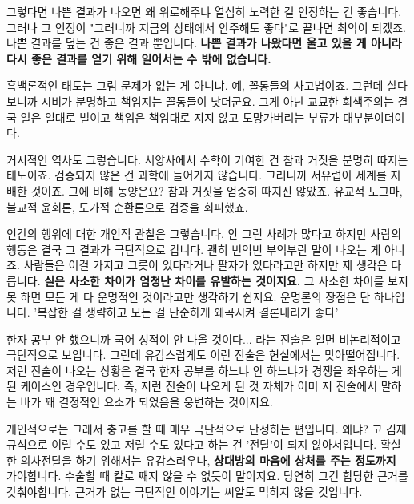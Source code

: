 그렇다면 나쁜 결과가 나오면 왜 위로해주냐
열심히 노력한 걸 인정하는 건 좋습니다. 그러나 그 인정이 "그러니까 지금의 상태에서 안주해도 좋다"로 끝나면 최악이 되겠죠.
나쁜 결과를 덮는 건 좋은 결과 뿐입니다.
\textbf{나쁜 결과가 나왔다면 울고 있을 게 아니라 다시 좋은 결과를 얻기 위해 일어서는 수 밖에 없습니다.}
\vspace{5mm}

흑백론적인 태도는 그럼 문제가 없는 게 아니냐.
예, 꼴통들의 사고법이죠.
그런데 살다보니까 시비가 분명하고 책임지는 꼴통들이 낫더군요.
그게 아닌 교묘한 회색주의는 결국 일은 일대로 벌이고 책임은 책임대로 지지 않고 도망가버리는 부류가 대부분이더이다.
\vspace{5mm}

거시적인 역사도 그렇습니다.
서양사에서 수학이 기여한 건 참과 거짓을 분명히 따지는 태도이죠.
검증되지 않은 건 과학에 들어가지 않습니다. 그러니까 서유럽이 세계를 지배한 것이죠.
그에 비해 동양은요? 참과 거짓을 엄중히 따지진 않았죠. 유교적 도그마, 불교적 윤회론, 도가적 순환론으로 검증을 회피했죠.
\vspace{5mm}

인간의 행위에 대한 개인적 관찰은 그렇습니다.
안 그런 사례가 많다고 하지만 사람의 행동은 결국 그 결과가 극단적으로 갑니다.
괜히 빈익빈 부익부란 말이 나오는 게 아니죠.
사람들은 이걸 가지고 그릇이 있다라거나 팔자가 있다라고만 하지만 제 생각은 다릅니다.
\textbf{실은 사소한 차이가 엄청난 차이를 유발하는 것이지요.}
그 사소한 차이를 보지 못 하면 모든 게 다 운명적인 것이라고만 생각하기 쉽지요.
운명론의 장점은 단 하나입니다. '복잡한 걸 생략하고 모든 걸 단순하게 왜곡시켜 결론내리기 좋다'
\vspace{5mm}

한자 공부 안 했으니까 국어 성적이 안 나올 것이다... 라는 진술은 일면 비논리적이고 극단적으로 보입니다.
그런데 유감스럽게도 이런 진술은 현실에서는 맞아떨어집니다.
저런 진술이 나오는 상황은 결국 한자 공부를 하느냐 안 하느냐가 경쟁을 좌우하는 게 된 케이스인 경우입니다.
즉, 저런 진술이 나오게 된 것 자체가 이미 저 진술에서 말하는 바가 꽤 결정적인 요소가 되었음을 웅변하는 것이지요.
\vspace{5mm}

개인적으로는 그래서 충고를 할 때 매우 극단적으로 단정하는 편입니다.
왜냐? 고 김재규식으로 이럴 수도 있고 저럴 수도 있다고 하는 건 '전달'이 되지 않아서입니다.
확실한 의사전달을 하기 위해서는 유감스러우나, \textbf{상대방의 마음에 상처를 주는 정도까지} 가야합니다.
수술할 때 칼로 째지 않을 수 없듯이 말이지요.
당연히 그건 합당한 근거를 갖춰야합니다.
근거가 없는 극단적인 이야기는 씨알도 먹히지 않을 것입니다.
\vspace{5mm}

